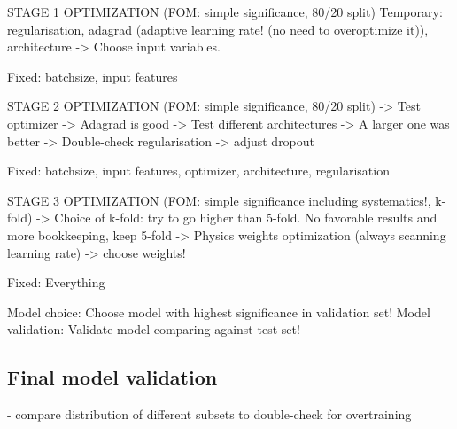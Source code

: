 STAGE 1 OPTIMIZATION (FOM: simple significance, 80/20 split)
Temporary: regularisation, adagrad (adaptive learning rate! (no need to overoptimize it)), architecture
-> Choose input variables. 

Fixed: batchsize, input features

STAGE 2 OPTIMIZATION (FOM: simple significance, 80/20 split)
-> Test optimizer -> Adagrad is good
-> Test different architectures -> A larger one was better
-> Double-check regularisation -> adjust dropout

Fixed: batchsize, input features, optimizer, architecture, regularisation

STAGE 3 OPTIMIZATION (FOM: simple significance including systematics!, k-fold)
-> Choice of k-fold: try to go higher than 5-fold. No favorable results and more bookkeeping, keep 5-fold
-> Physics weights optimization (always scanning learning rate) -> choose weights!

Fixed: Everything


Model choice: Choose model with highest significance in validation set!
Model validation: Validate model comparing against test set!




\subsection{Final model validation}
- compare distribution of different subsets to double-check for overtraining
